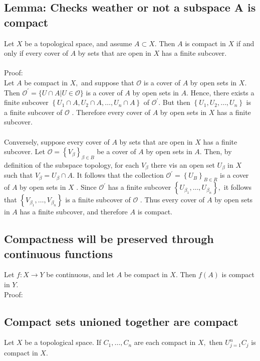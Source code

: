 \documentclass[12pt]{article}
\begin{document}
	\subsection{Lemma: Checks weather or not a subspace A is compact}
	Let $X$ be a topological space, and assume $A \subset X .$ Then $ A $ is compact in $ X $ if and only if every cover of $A$ by sets that are open in $X$ has a finite subcover.\\
	\\
	Proof:\\
	Let $A$ be compact in $X ,$ and suppose that $\mathcal { O }$ is a cover of $A$ by
	open sets in $X .$ Then $\mathcal { O } ^ { \prime } = \{ U \cap A | U \in \mathcal { O } \}$ is a cover of $A$ by open sets in $A .$ Hence, there exists a finite subcover $\left\{ U _ { 1 } \cap A , U _ { 2 } \cap A , \ldots , U _ { n } \cap A \right\}$
	of $\mathcal { O } ^ { \prime } .$ But then $\left\{ U _ { 1 } , U _ { 2 } , \ldots , U _ { n } \right\}$ is a finite subcover of $\mathcal { O }$ . Therefore
	every cover of $A$ by open sets in $X$ has a finite subcover.\\
	\\
	Conversely, suppose every cover of $A$ by sets that are open in $X$
	has a finite subcover. Let $\mathcal { O } = \left\{ V _ { \beta } \right\} _ { \beta \in B }$ be a cover of $A$ by open sets
	in $A .$ Then, by definition of the subspace topology, for each $V _ { \beta }$ there vis an open set $U _ { \beta }$ in $X$ such that $V _ { \beta } = U _ { \beta } \cap A .$ It follows that the
	collection $\mathcal { O } ^ { \prime } = \left\{ U _ { B } \right\} _ { B \in R }$ is a cover of $A$ by open sets in $X$ . Since $\mathcal { O } ^ { \prime }$ has a finite subcover $\left\{ U _ { \beta _ { 1 } } , \ldots , U _ { \beta _ { n } } \right\} ,$ it follows that $\left\{ V _ { \beta _ { 1 } } , \ldots , V _ { \beta _ { n } } \right\}$ is a
	finite subcover of $\mathcal { O }$ . Thus every cover of $A$ by open sets in $A$ has a finite subcover, and therefore $ A $ is compact.\\
	\subsection{Compactness will be preserved through continuous functions}
	Let $f : X \rightarrow Y$ be continuous, and let $A$ be compact in $X .$ Then $ f(A) $ is compact in $ Y $.\\
	Proof:\\
	
	\subsection{Compact sets unioned together are compact}
	Let $ X $ be a topological space. If $C _ { 1 } , \ldots , C _ { n }$ are each compact in $X ,$ then $U _ { j = 1 } ^ { n } C _ { j }$ is compact	in $X .$
\end{document}
